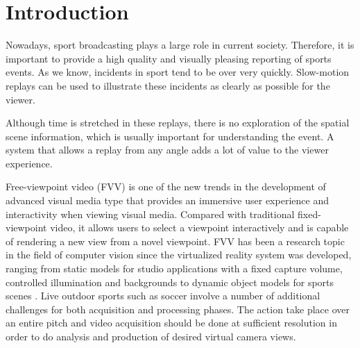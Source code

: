 \section{Introduction}
Nowadays, sport broadcasting plays a large role in current society.
Therefore, it is important to provide a high quality and visually pleasing reporting of sports events.
As we know, incidents in sport tend to be over very quickly.
Slow-motion replays can be used to illustrate these incidents as clearly as possible for the viewer. 

Although time is stretched in these replays, there is no exploration of the spatial scene information, which is usually 
important for understanding the event.
A system that allows a replay from any angle adds a lot of value to the viewer experience.



Free-viewpoint video (FVV) is one of the new trends in the development of advanced visual media type
that provides an immersive user experience and interactivity when viewing
visual media. Compared with traditional fixed-viewpoint
video, it allows users to select a viewpoint interactively and
is capable of rendering a new view from a novel viewpoint.
FVV has been a research topic in the field of computer vision 
since the virtualized reality system \cite{b4} was developed,
ranging from static models for studio applications with a fixed
capture volume, controlled illumination and backgrounds \cite{b5} 
to dynamic object models for sports scenes \cite{b6,b7,b8}.
Live outdoor sports such as soccer involve a number of additional challenges for both acquisition and processing phases. 
The action take place over an entire pitch and video acquisition should be done at sufficient resolution in order to
do analysis and production of desired virtual camera views.

